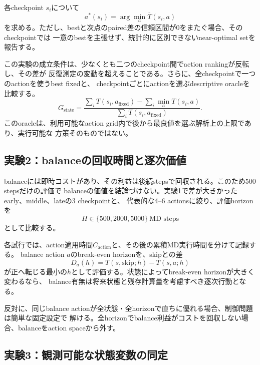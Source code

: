 各checkpoint $s_i$について
\begin{equation}
 a^*(s_i)=\arg\min_a \overline{T}(s_i,a)
\end{equation}
を求める。ただし、bestと次点のpaired差の信頼区間が0をまたぐ場合、そのcheckpointでは
一意のbestを主張せず、統計的に区別できないnear-optimal setを報告する。

この実験の成立条件は、少なくとも二つのcheckpoint間でaction rankingが反転し、その差が
反復測定の変動を超えることである。さらに、全checkpointで一つのactionを使うbest fixedと、
checkpointごとにactionを選ぶdescriptive oracleを比較する。
\begin{equation}
 G_{\mathrm{state}}
 =\frac{\sum_i T(s_i,a_{\mathrm{fixed}})
             -\sum_i\min_a T(s_i,a)}
            {\sum_i T(s_i,a_{\mathrm{fixed}})}.
\end{equation}
このoracleは、利用可能なaction grid内で後から最良値を選ぶ解析上の上限であり、実行可能な
方策そのものではない。

\subsection{実験2：balanceの回収時間と逐次価値}

balanceには即時コストがあり、その利益は後続stepsで回収される。このため500 stepsだけの評価で
balanceの価値を結論づけない。実験1で差が大きかったearly、middle、lateの3 checkpointと、
代表的な4--6 actionsに絞り、評価horizonを
\begin{equation}
 H\in\{500,2000,5000\}\ \text{MD steps}
\end{equation}
として比較する。

各試行では、action適用時間$C_{\mathrm{action}}$と、その後の累積MD実行時間を分けて記録する。
balance action $a$のbreak-even horizonを、skipとの差
\begin{equation}
 D_a(h)=T(s,\mathrm{skip};h)-T(s,a;h)
\end{equation}
が正へ転じる最小の$h$として評価する。状態によってbreak-even horizonが大きく変わるなら、
balance有無は将来状態と残存計算量を考慮すべき逐次行動となる。

反対に、同じbalance actionが全状態・全horizonで直ちに優れる場合、制御問題は簡単な固定設定で
解ける。全horizonでbalance利益がコストを回収しない場合、balanceをaction spaceから外す。

\subsection{実験3：観測可能な状態変数の同定}

